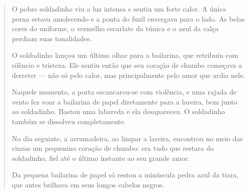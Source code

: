 \begin{quote}
O pobre soldadinho viu a luz intensa e sentiu um forte calor. A única
perna estava amolecendo e a ponta do fuzil envergava para o lado. As
belas cores do uniforme, o vermelho escarlate da túnica e o azul da
calça perdiam suas tonalidades.

O soldadinho lançou um último olhar para a bailarina, que retribuiu com
silêncio e tristeza. Ele sentiu então que seu coração de chumbo começava
a derreter --- não só pelo calor, mas principalmente pelo amor que ardia
nele.

Naquele momento, a porta escancarou-se com violência, e uma rajada de
vento fez voar a bailarina de papel diretamente para a lareira, bem
junto ao soldadinho. Bastou uma labareda e ela desapareceu. O soldadinho
também se dissolveu completamente.

No dia seguinte, a arrumadeira, ao limpar a lareira, encontrou no meio
das cinzas um pequenino coração de chumbo: era tudo que restara do
soldadinho, fiel até o último instante ao seu grande amor.

Da pequena bailarina de papel só restou a minúscula pedra azul da tiara,
que antes brilhava em seus longos cabelos negros.
\end{quote}



